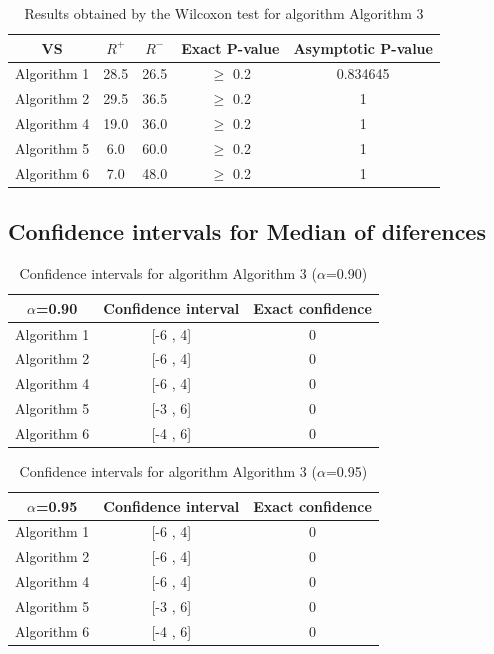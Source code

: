 \documentclass[a4paper,10pt]{article}
\begin{document}
\begin{table}[!htp]
\centering\small
\begin{tabular}{
|c|c|c|c|c|}
\hline
 VS & $R^{+}$ & $R^{-}$ & Exact P-value & Asymptotic P-value \\ \hline 
Algorithm 1 & 28.5 & 26.5 & $\geq$ 0.2 & 0.834645\\ \hline 
Algorithm 2 & 29.5 & 36.5 & $\geq$ 0.2 & 1\\ \hline 
Algorithm 4 & 19.0 & 36.0 & $\geq$ 0.2 & 1\\ \hline 
Algorithm 5 & 6.0 & 60.0 & $\geq$ 0.2 & 1\\ \hline 
Algorithm 6 & 7.0 & 48.0 & $\geq$ 0.2 & 1\\ \hline 

\end{tabular}
\caption{Results obtained by the Wilcoxon test for algorithm Algorithm 3}
\end{table}

\subsection{Confidence intervals for Median of diferences}

\begin{table}[!htp]
\centering\small
\begin{tabular}{
|c|c|c|}
\hline
 $\alpha$=0.90 & Confidence interval & Exact confidence \\ \hline 
Algorithm 1 & [-6 , 4] & 0\\ \hline 
Algorithm 2 & [-6 , 4] & 0\\ \hline 
Algorithm 4 & [-6 , 4] & 0\\ \hline 
Algorithm 5 & [-3 , 6] & 0\\ \hline 
Algorithm 6 & [-4 , 6] & 0\\ \hline 

\end{tabular}
\caption{Confidence intervals for algorithm Algorithm 3 ($\alpha$=0.90)}
\end{table}
\begin{table}[!htp]
\centering\small
\begin{tabular}{
|c|c|c|}
\hline
 $\alpha$=0.95 & Confidence interval & Exact confidence \\ \hline 
Algorithm 1 & [-6 , 4] & 0\\ \hline 
Algorithm 2 & [-6 , 4] & 0\\ \hline 
Algorithm 4 & [-6 , 4] & 0\\ \hline 
Algorithm 5 & [-3 , 6] & 0\\ \hline 
Algorithm 6 & [-4 , 6] & 0\\ \hline 

\end{tabular}
\caption{Confidence intervals for algorithm Algorithm 3 ($\alpha$=0.95)}
\end{table}
\end{document}
